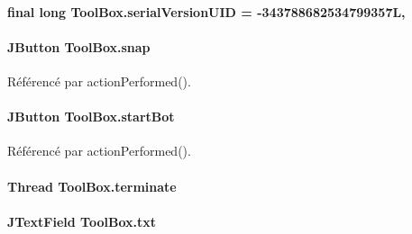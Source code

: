 \paragraph[{serial\+Version\+U\+I\+D}]{\setlength{\rightskip}{0pt plus 5cm}final long Tool\+Box.\+serial\+Version\+U\+I\+D = -\/343788682534799357\+L\hspace{0.3cm}{\ttfamily [static]}, {\ttfamily [private]}}\label{classToolBox_abf0aa35019b6585ca6ad5b23a4ec1ae5}
\hypertarget{classToolBox_aa32b3efdf92088255ff9abcf0f521bd3}{}
\paragraph[{snap}]{\setlength{\rightskip}{0pt plus 5cm}J\+Button Tool\+Box.\+snap\hspace{0.3cm}{\ttfamily [private]}}\label{classToolBox_aa32b3efdf92088255ff9abcf0f521bd3}


Référencé par action\+Performed().

\hypertarget{classToolBox_a48363bbac3348d479b56d449f022610c}{}
\paragraph[{start\+Bot}]{\setlength{\rightskip}{0pt plus 5cm}J\+Button Tool\+Box.\+start\+Bot\hspace{0.3cm}{\ttfamily [private]}}\label{classToolBox_a48363bbac3348d479b56d449f022610c}


Référencé par action\+Performed().

\hypertarget{classToolBox_a4a4a941d9d6b7892fab6299754098d16}{}
\paragraph[{terminate}]{\setlength{\rightskip}{0pt plus 5cm}Thread Tool\+Box.\+terminate\hspace{0.3cm}{\ttfamily [package]}}\label{classToolBox_a4a4a941d9d6b7892fab6299754098d16}
\hypertarget{classToolBox_a0872e43afdb03a8ea032ba9091a741c0}{}
\paragraph[{txt}]{\setlength{\rightskip}{0pt plus 5cm}J\+Text\+Field Tool\+Box.\+txt\hspace{0.3cm}{\ttfamily [private]}}\label{classToolBox_a0872e43afdb03a8ea032ba9091a741c0}
\hypertarget{classToolBox_ab44fa7732e3d081f6a771c27c503cb8d}{}
